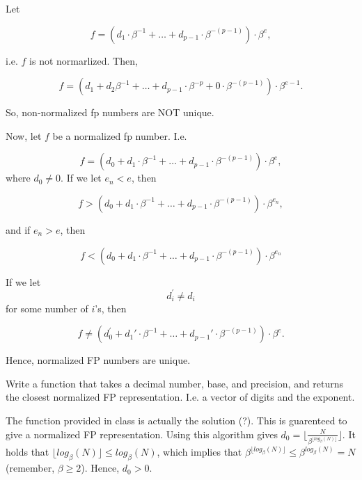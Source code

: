 \documentclass[]{book}
\theoremstyle{definition}
\theoremstyle{definition}
\theoremstyle{definition}
\theoremstyle{remark}
\let\BeginKnitrBlock\begin \let\EndKnitrBlock\end
\begin{document}
\BeginKnitrBlock{solution}
\iffalse{} {Solution. } \fi{}Let

\[f = \left(d_1\cdot\beta^{-1} + \ldots + d_{p-1}\cdot\beta^{-(p-1)}\right)\cdot\beta^{e},\]

i.e. \(f\) is not normarlized. Then,

\[
f = \left(d_1+d_2\beta^{-1} + \ldots + d_{p-1}\cdot\beta^{-p} + 0\cdot \beta^{-(p-1)}\right)\cdot\beta^{e-1}.
\]

So, non-normalized fp numbers are NOT unique.

Now, let \(f\) be a normalized fp number. I.e.

\[
f = \left(d_0 + d_1\cdot\beta^{-1} + \ldots + d_{p-1}\cdot\beta^{-(p-1)} \right)\cdot\beta^e,
\] where \(d_0 \neq 0\). If we let \(e_n < e\), then

\[
f > \left(d_0 + d_1\cdot\beta^{-1} + \ldots + d_{p-1}\cdot\beta^{-(p-1)} \right)\cdot\beta^{e_n},
\]

and if \(e_n > e\), then

\[
f < \left(d_0 + d_1\cdot\beta^{-1} + \ldots + d_{p-1}\cdot\beta^{-(p-1)} \right)\cdot\beta^{e_n}
\]

If we let \[d_i^\prime \neq d_i\] for some number of \(i\)'s, then

\[
f \neq \left(d_0^\prime + d_1\prime\cdot\beta^{-1} + \ldots + d_{p-1}\prime\cdot\beta^{-(p-1)} \right)\cdot\beta^e.
\]

Hence, normalized FP numbers are unique.
\EndKnitrBlock{solution}

\BeginKnitrBlock{exercise}
\protect\hypertarget{exr:q104}{}{\label{exr:q104} }Write a function that
takes a decimal number, base, and precision, and returns the closest
normalized FP representation. I.e. a vector of digits and the exponent.
\EndKnitrBlock{exercise}

\BeginKnitrBlock{solution}
\iffalse{} {Solution. } \fi{}The function provided in class is actually
the solution (?). This is guarenteed to give a normalized FP
representation. Using this algorithm gives
\(d_0 = \lfloor \frac{N}{\beta^{\lfloor log_{\beta}\left(N\right) \rfloor}}\rfloor\).
It holds that
\(\lfloor log_{\beta}\left(N\right) \rfloor \le log_\beta\left(N\right)\),
which implies that
\(\beta^{\lfloor log_{\beta}\left(N\right) \rfloor} \le \beta^{log_\beta\left(N\right)} = N\)
(remember, \(\beta \geq 2\)). Hence, \(d_0 > 0\).
\EndKnitrBlock{solution}
\end{document}
